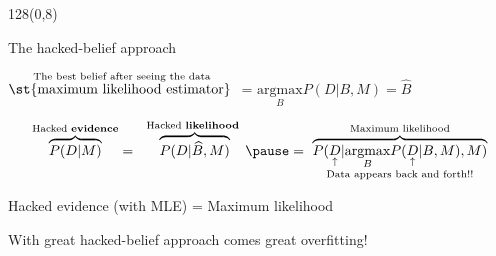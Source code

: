 \documentclass[shownotes]{beamer}
\begin{document}
\begin{frame}
 \begin{textblock}{128}(0,8)
\begin{center}
 \large The hacked-belief approach
\end{center}
\end{textblock}
\vspace{0.5cm}

\begin{center}
 \centering  $ \overset{\text{The best belief after seeing the data}}{\text{\st{maximum likelihood estimator} }}$ = $\underset{B }{\text{argmax}} P(D|B,M) = \widehat{B}$  
\end{center}


\pause

 \begin{equation*}
\overbrace{P(D|M)}^{\text{\scriptsize Hacked \textbf{evidence}}} = \ \ \overbrace{P(D|\widehat{B},M)}^{\text{\scriptsize Hacked \textbf{likelihood} }} \pause  = \  \underset{\text{Data appears back and forth!!}}{\overbrace{P(\underset{\uparrow}{D}|\underset{B}{\text{argmax}} P(\underset{\uparrow}{D}|B,M), M)}^{\text{\scriptsize Maximum likelihood}}}
\end{equation*}


\pause

\vspace{0.3cm}

\begin{mdframed}[backgroundcolor=black!15]
\centering
 \large Hacked evidence (with MLE) = Maximum likelihood
\end{mdframed}

\pause

\vspace{0.3cm}
\begin{center}
 \centering \large With great hacked-belief approach comes great overfitting!  
\end{center}
  
 
\end{frame}
\end{document}
